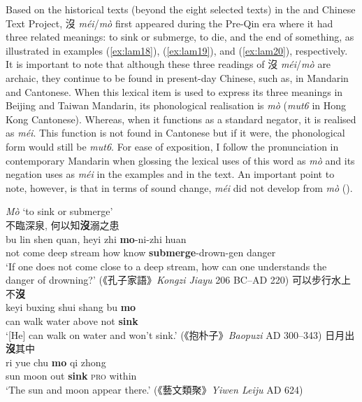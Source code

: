 \documentclass[output=paper]{langscibook}
\begin{document}
Based on the historical texts (beyond the eight selected texts) in the \cite{chant} and Chinese Text Project, 沒 \textit{méi}/\textit{mò} first appeared during the Pre-Qin era where it had three related meanings: to sink or submerge, to die, and the end of something, as illustrated in examples (\ref{ex:lam18}), (\ref{ex:lam19}), and (\ref{ex:lam20}), respectively. It is important to note that although these three readings of 沒 \textit{méi}/\textit{mò}  are archaic, they continue to be found in present-day Chinese, such as, in Mandarin and Cantonese. When this lexical item is used to express its three meanings in Beijing and Taiwan Mandarin, its phonological realisation is \textit{mò} (\textit{mut6} in Hong Kong Cantonese). Whereas, when it functions as a standard negator, it is realised as \textit{méi}. This function is not found in Cantonese but if it were, the phonological form would still be \textit{mut6}. For ease of exposition, I follow the pronunciation in contemporary Mandarin when glossing the lexical uses of this word as \textit{mò} and its negation uses as \textit{méi} in the examples and in the text. An important point to note, however, is that in terms of sound change, \textit{méi} did not develop from \textit{mò} (\citealt[390]{Schuessler2007}).

\ea \textit{Mò} `to sink or submerge'  \label{ex:lam18}\\
  \ea 不臨深泉, 何以知\textbf{沒}溺之患 \label{ex:lam18a}\\
  	\gll bu lin shen quan, heyi zhi \textbf{mo}-ni-zhi huan\\
  	not come	 deep stream how know \textbf{submerge}-drown-gen danger\\ 
  	\glt `If one does not come close to a deep stream, how can one understands the danger of drowning?' (《孔子家語》\emph{Kongzi Jiayu} 206 BC–AD 220)  
  \ex 可以步行水上不\textbf{沒} \label{ex:lam18b}\\
  	\gll keyi buxing shui shang bu \textbf{mo}\\ 
  	can walk water above not \textbf{sink}\\
  	\glt `[He] can walk on water and won't sink.' (《抱朴子》\emph{Baopuzi} AD 300–343)  
  \ex 日月出\textbf{沒}其中 \label{ex:lam18c}\\
	\gll ri yue chu \textbf{mo} qi zhong\\ 
	sun	moon	 out \textbf{sink} \textsc{pro} within\\ 
	\glt `The sun and moon appear there.' (《藝文類聚》\emph{Yiwen Leiju} AD 624)
\z \z 
\end{document}
